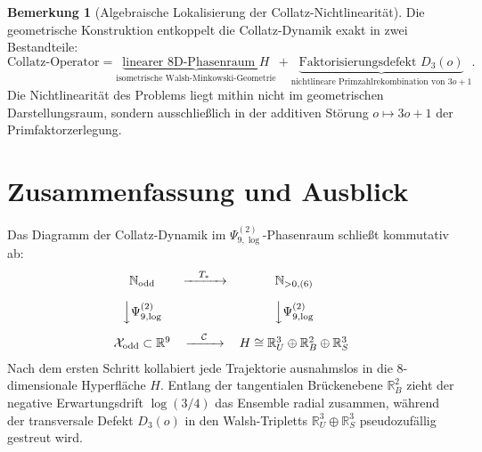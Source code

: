 \documentclass[11pt,a4paper]{article}
\theoremstyle{plain}
\theoremstyle{definition}
\newtheorem{remark}[theorem]{Bemerkung}
\newcommand{\N}{\mathbb{N}}
\newcommand{\R}{\mathbb{R}}
\begin{document}
\begin{remark}[Algebraische Lokalisierung der Collatz-Nichtlinearität]
Die geometrische Konstruktion entkoppelt die Collatz-Dynamik exakt in zwei Bestandteile:
\begin{equation}
    \text{Collatz-Operator} = \underbrace{\text{linearer 8D-Phasenraum } H}_{\text{isometrische Walsh-Minkowski-Geometrie}} + \underbrace{\text{Faktorisierungsdefekt } D_3(o)}_{\text{nichtlineare Primzahlrekombination von } 3o+1}.
\end{equation}
Die Nichtlinearität des Problems liegt mithin nicht im geometrischen Darstellungsraum, sondern ausschließlich in der additiven Störung $o \mapsto 3o+1$ der Primfaktorzerlegung.
\end{remark}

\section{Zusammenfassung und Ausblick}

Das Diagramm der Collatz-Dynamik im $\Psi_{9,\log}^{(2)}$-Phasenraum schließt kommutativ ab:
\begin{equation}
\begin{array}{ccc}
    \N_{\mathrm{odd}} & \xrightarrow{\quad T_* \quad} & \N_{>0,(6)} \\[1em]
    \Big\downarrow \Psi_{9,\log}^{(2)} & & \Big\downarrow \Psi_{9,\log}^{(2)} \\[1em]
    \mathcal{X}_{\mathrm{odd}} \subset \R^9 & \xrightarrow{\quad \mathcal{C} \quad} & H \cong \R^3_U \oplus \R^2_B \oplus \R^3_S
\end{array}
\end{equation}
Nach dem ersten Schritt kollabiert jede Trajektorie ausnahmslos in die 8-dimensionale Hyperfläche $H$. Entlang der tangentialen Brückenebene $\R^2_B$ zieht der negative Erwartungsdrift $\log(3/4)$ das Ensemble radial zusammen, während der transversale Defekt $D_3(o)$ in den Walsh-Tripletts $\R^3_U \oplus \R^3_S$ pseudozufällig gestreut wird.
\end{document}
